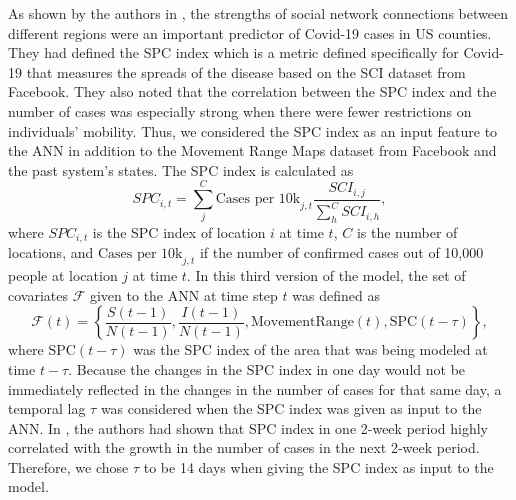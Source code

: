 As shown by the authors in \cite{kuchlerGeographicSpreadCOVID192020}, the strengths of social network connections between different regions were an important predictor of Covid-19 cases in US counties.
They had defined the \gls{SPC} index which is a metric defined specifically for Covid-19 that measures the spreads of the disease based on the \gls{SCI} dataset from Facebook.
They also noted that the correlation between the \gls{SPC} index and the number of cases was especially strong when there were fewer restrictions on individuals' mobility.
Thus, we considered the \gls{SPC} index as an input feature to the \gls{ANN} in addition to the Movement Range Maps dataset from Facebook and the past system's states.
The \gls{SPC} index is calculated as
\begin{equation*}
    SPC_{i,t} = \sum_j^C \text{Cases per 10k}_{j,t} \frac{SCI_{i,j}}{\sum_h^C SCI_{i,h}},
\end{equation*}
where $SPC_{i,t}$ is the \gls{SPC} index of location $i$ at time $t$, $C$ is the number of locations, and $\text{Cases per 10k}_{j,t}$ if the number of confirmed cases out of 10,000 people at location $j$ at time $t$.
In this third version of the model, the set of covariates $\mathcal{F}$ given to the \gls{ANN} at time step $t$ was defined as
\begin{equation*}
    \mathcal{F}(t) = \left\lbrace \frac{S(t-1)}{N(t-1)}, \frac{I(t-1)}{N(t-1)}, \text{MovementRange}(t), \text{SPC}(t - \tau) \right\rbrace,
\end{equation*}
where $\text{SPC}(t - \tau)$ was the \gls{SPC} index of the area that was being modeled at time $t - \tau$.
Because the changes in the \gls{SPC} index in one day would not be immediately reflected in the changes in the number of cases for that same day, a temporal lag $\tau$ was considered when the \gls{SPC} index was given as input to the \gls{ANN}.
In \cite{kuchlerGeographicSpreadCOVID192020}, the authors had shown that \gls{SPC} index in one 2-week period highly correlated with the growth in the number of cases in the next 2-week period.
Therefore, we chose $\tau$ to be 14 days when giving the \gls{SPC} index as input to the model.